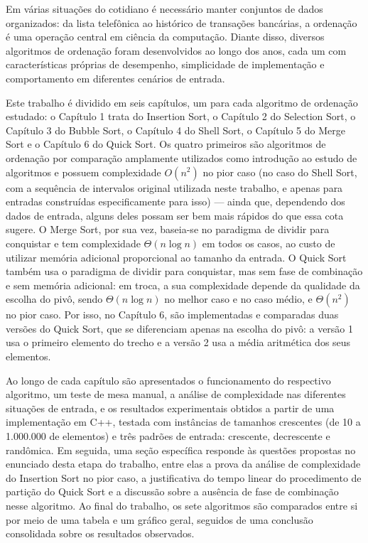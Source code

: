 \qquad Em várias situações do cotidiano é necessário manter conjuntos de
dados organizados: da lista telefônica ao histórico de transações
bancárias, a ordenação é uma operação central em ciência da
computação. Diante disso, diversos algoritmos de ordenação foram
desenvolvidos ao longo dos anos, cada um com características
próprias de desempenho, simplicidade de implementação e
comportamento em diferentes cenários de entrada.

\qquad Este trabalho é dividido em seis capítulos, um para cada
algoritmo de ordenação estudado: o Capítulo 1 trata do Insertion
Sort, o Capítulo 2 do Selection Sort, o Capítulo 3 do Bubble Sort, o
Capítulo 4 do Shell Sort, o Capítulo 5 do Merge Sort e o Capítulo 6 do
Quick Sort. Os quatro primeiros são algoritmos de ordenação por
comparação amplamente utilizados como introdução ao estudo de
algoritmos e possuem complexidade $O(n^2)$ no pior caso (no caso do
Shell Sort, com a sequência de intervalos original utilizada neste
trabalho, e apenas para entradas construídas especificamente para
isso) --- ainda que, dependendo dos dados de entrada, alguns deles
possam ser bem mais rápidos do que essa cota sugere. O Merge Sort, por
sua vez, baseia-se no paradigma de dividir para conquistar e tem
complexidade $\Theta(n \log n)$ em todos os casos, ao custo de
utilizar memória adicional proporcional ao tamanho da entrada. O Quick
Sort também usa o paradigma de dividir para conquistar, mas sem fase de
combinação e sem memória adicional: em troca, a sua complexidade
depende da qualidade da escolha do pivô, sendo $\Theta(n \log n)$ no
melhor caso e no caso médio, e $\Theta(n^2)$ no pior caso. Por isso,
no Capítulo 6, são implementadas e comparadas duas versões do Quick
Sort, que se diferenciam apenas na escolha do pivô: a versão 1 usa o
primeiro elemento do trecho e a versão 2 usa a média aritmética dos
seus elementos.

\qquad Ao longo de cada capítulo são apresentados o funcionamento do
respectivo algoritmo, um teste de mesa manual, a análise de
complexidade nas diferentes situações de entrada, e os resultados
experimentais obtidos a partir de uma implementação em C++, testada
com instâncias de tamanhos crescentes (de 10 a 1.000.000 de
elementos) e três padrões de entrada: crescente, decrescente e
randômica. Em seguida, uma seção específica responde às questões
propostas no enunciado desta etapa do trabalho, entre elas a prova da
análise de complexidade do Insertion Sort no pior caso, a
justificativa do tempo linear do procedimento de partição do Quick
Sort e a discussão sobre a ausência de fase de combinação nesse
algoritmo. Ao final do trabalho, os sete algoritmos são comparados
entre si por meio de uma tabela e um gráfico geral, seguidos de uma
conclusão consolidada sobre os resultados observados.
